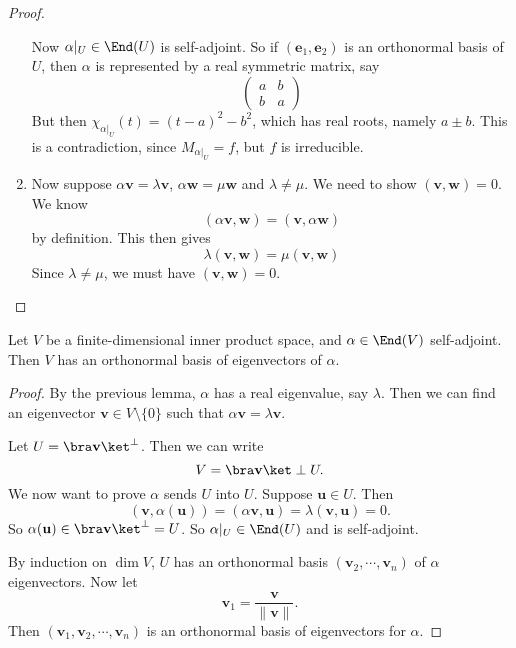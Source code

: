 \documentclass[a4paper]{article}
\begin{document}
\begin{proof}
\begin{enumerate}
      Now $\alpha|_U \in \End(U)$ is self-adjoint. So if $(\mathbf{e}_1, \mathbf{e}_2)$ is an orthonormal basis of $U$, then $\alpha$ is represented by a real symmetric matrix, say
      \[
        \begin{pmatrix}
          a & b\\
          b & a
        \end{pmatrix}
      \]
      But then $\chi_{\alpha|_U}(t) = (t - a)^2 - b^2$, which has real roots, namely $a \pm b$. This is a contradiction, since $M_{\alpha|_U} = f$, but $f$ is irreducible.
    \item Now suppose $\alpha \mathbf{v} = \lambda \mathbf{v}$, $\alpha \mathbf{w} = \mu \mathbf{w}$ and $\lambda \not= \mu$. We need to show $(\mathbf{v}, \mathbf{w}) = 0$. We know
      \[
        (\alpha \mathbf{v}, \mathbf{w}) = (\mathbf{v}, \alpha \mathbf{w})
      \]
      by definition. This then gives
      \[
        \lambda (\mathbf{v}, \mathbf{w}) = \mu (\mathbf{v}, \mathbf{w})
      \]
      Since $\lambda \not= \mu$, we must have $(\mathbf{v}, \mathbf{w}) = 0$.\qedhere
  \end{enumerate}
\end{proof}

\begin{thm}
  Let $V$ be a finite-dimensional inner product space, and $\alpha \in \End(V)$ self-adjoint. Then $V$ has an orthonormal basis of eigenvectors of $\alpha$.
\end{thm}

\begin{proof}
  By the previous lemma, $\alpha$ has a real eigenvalue, say $\lambda$. Then we can find an eigenvector $\mathbf{v} \in V\setminus \{0\}$ such that $\alpha \mathbf{v} = \lambda \mathbf{v}$.

  Let $U = \bra \mathbf{v}\ket ^\perp$. Then we can write
  \[
    V = \bra \mathbf{v}\ket \perp U.
  \]
  We now want to prove $\alpha$ sends $U$ into $U$. Suppose $\mathbf{u} \in U$. Then
  \[
    (\mathbf{v}, \alpha (\mathbf{u})) = (\alpha \mathbf{v}, \mathbf{u}) = \lambda (\mathbf{v}, \mathbf{u}) = 0.
  \]
  So $\alpha (\mathbf{u}) \in \bra \mathbf{v}\ket^\perp = U$. So $\alpha|_U \in \End(U)$ and is self-adjoint.

  By induction on $\dim V$, $U$ has an orthonormal basis $(\mathbf{v}_2, \cdots, \mathbf{v}_n)$ of $\alpha$ eigenvectors. Now let
  \[
    \mathbf{v}_1 = \frac{\mathbf{v}}{\|\mathbf{v}\|}.
  \]
  Then $(\mathbf{v}_1, \mathbf{v}_2, \cdots, \mathbf{v}_n)$ is an orthonormal basis of eigenvectors for $\alpha$.
\end{proof}
\end{document}
